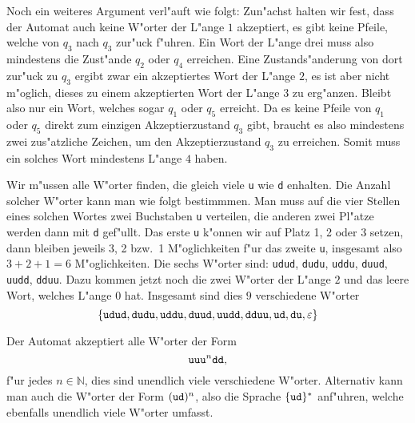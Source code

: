 \begin{loesung}
\begin{teilaufgaben}
Noch ein weiteres Argument verl"auft wie folgt:
Zun"achst halten wir fest, dass der Automat auch keine W"orter der
L"ange $1$ akzeptiert, es gibt keine Pfeile, welche von $q_3$ nach
$q_3$ zur"uck f"uhren. Ein Wort der L"ange drei muss also mindestens
die Zust"ande $q_2$ oder $q_4$ erreichen. Eine Zustands"anderung von
dort zur"uck zu $q_3$ ergibt zwar ein akzeptiertes Wort der L"ange
$2$, es ist aber nicht m"oglich, dieses zu einem akzeptierten Wort
der L"ange $3$ zu erg"anzen.
Bleibt also nur ein Wort, welches
sogar $q_1$ oder $q_5$ erreicht. Da es keine Pfeile von $q_1$
oder $q_5$ direkt zum einzigen Akzeptierzustand $q_3$ gibt,
braucht es also mindestens zwei zus"atzliche Zeichen, um den
Akzeptierzustand $q_3$ zu erreichen. Somit muss ein solches
Wort mindestens L"ange $4$ haben.
\item Wir m"ussen alle W"orter finden, die gleich viele {\tt u} wie {\tt d}
enhalten. Die Anzahl solcher W"orter kann man wie folgt bestimmmen.
Man muss auf die vier Stellen eines solchen Wortes zwei Buchstaben
{\tt u} verteilen, die anderen zwei Pl"atze werden dann mit {\tt d}
gef"ullt. Das erste {\tt u} k"onnen wir auf Platz 1, 2 oder 3 setzen,
dann bleiben jeweils 3, 2 bzw.~1 M"oglichkeiten f"ur das zweite {\tt u},
insgesamt also $3+2+1=6$ M"oglichkeiten. Die sechs W"orter sind:
{\tt udud}, {\tt dudu}, {\tt uddu}, {\tt duud}, {\tt uudd}, {\tt dduu}.
Dazu kommen jetzt noch die zwei W"orter der L"ange $2$ und das leere Wort,
welches L"ange $0$ hat. Insgesamt sind dies $9$ verschiedene W"orter
\[
\{
{\tt udud}, {\tt dudu}, {\tt uddu}, {\tt duud}, {\tt uudd}, {\tt dduu},
{\tt ud},{\tt du}, \varepsilon
\}
\]
\item Der Automat akzeptiert alle W"orter der Form
\[
\text{\tt uu}
\text{\tt u}^n
\text{\tt dd},
\]
f"ur jedes $n\in \mathbb N$,
dies sind unendlich viele verschiedene W"orter. Alternativ kann
man auch die W"orter der Form $({\tt ud})^n$, also die Sprache
$\{{\tt ud}\}^*$ anf"uhren, welche ebenfalls unendlich viele W"orter
umfasst.
\qedhere
\end{teilaufgaben}
\end{loesung}

